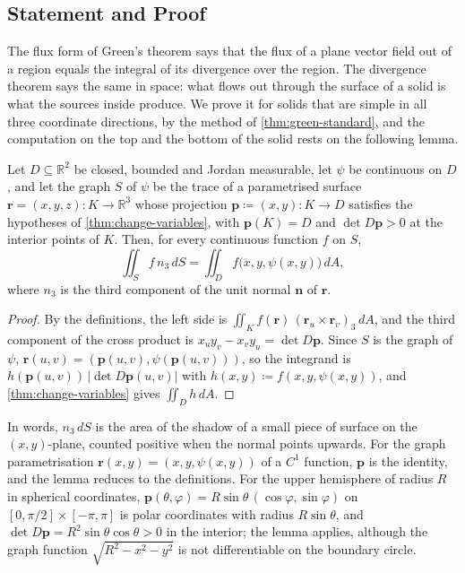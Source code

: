 \subsection{Statement and Proof}

The flux form of Green's theorem says that the flux of a plane vector field out of a region equals the integral of its divergence over the region. The divergence theorem says the same in space: what flows out through the surface of a solid is what the sources inside produce. We prove it for solids that are simple in all three coordinate directions, by the method of \cref{thm:green-standard}, and the computation on the top and the bottom of the solid rests on the following lemma.

\begin{lemma}
\label{lem:projected-flux}
Let $D\subseteq\mathbb R^2$ be closed, bounded and Jordan measurable, let $\psi$ be continuous on $D$, and let the graph $S$ of $\psi$ be the trace of a parametrised surface $\mathbf r=(x,y,z)\colon K\to\mathbb R^3$ whose projection $\mathbf p\coloneqq(x,y)\colon K\to D$ satisfies the hypotheses of \cref{thm:change-variables}, with $\mathbf p(K)=D$ and $\det D\mathbf p>0$ at the interior points of $K$. Then, for every continuous function $f$ on $S$,
\[
\iint_Sf\,n_3\,dS=\iint_Df\bigl(x,y,\psi(x,y)\bigr)\,dA ,
\]
where $n_3$ is the third component of the unit normal $\mathbf n$ of $\mathbf r$.
\end{lemma}

\begin{proof}
By the definitions, the left side is $\iint_Kf(\mathbf r)\,(\mathbf r_u\times\mathbf r_v)_3\,dA$, and the third component of the cross product is $x_uy_v-x_vy_u=\det D\mathbf p$. Since $S$ is the graph of $\psi$, $\mathbf r(u,v)=(\mathbf p(u,v),\psi(\mathbf p(u,v)))$, so the integrand is $h(\mathbf p(u,v))\,|\det D\mathbf p(u,v)|$ with $h(x,y)\coloneqq f(x,y,\psi(x,y))$, and \cref{thm:change-variables} gives $\iint_Dh\,dA$.
\end{proof}

In words, $n_3\,dS$ is the area of the shadow of a small piece of surface on the $(x,y)$-plane, counted positive when the normal points upwards. For the graph parametrisation $\mathbf r(x,y)=(x,y,\psi(x,y))$ of a $C^1$ function, $\mathbf p$ is the identity, and the lemma reduces to the definitions. For the upper hemisphere of radius $R$ in spherical coordinates, $\mathbf p(\theta,\varphi)=R\sin\theta\,(\cos\varphi,\sin\varphi)$ on $[0,\pi/2]\times[-\pi,\pi]$ is polar coordinates with radius $R\sin\theta$, and $\det D\mathbf p=R^2\sin\theta\cos\theta>0$ in the interior; the lemma applies, although the graph function $\sqrt{R^2-x^2-y^2}$ is not differentiable on the boundary circle.

